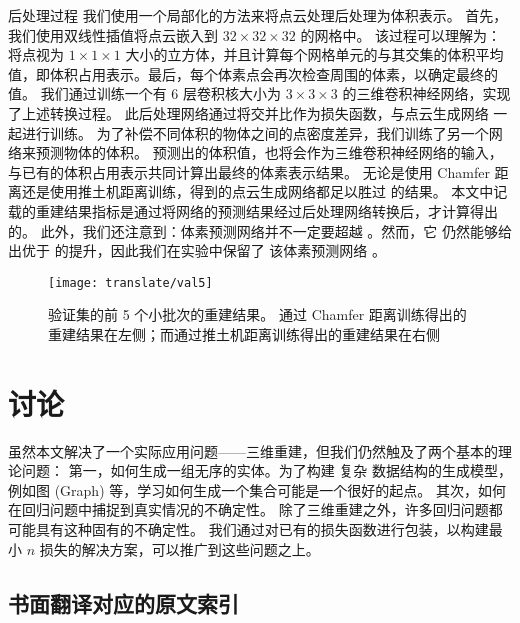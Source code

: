 {\heiti 后处理过程}
我们使用一个局部化的方法来将点云处理后处理为体积表示。
首先，我们使用双线性插值将点云嵌入到 $32 \times 32 \times 32$ 的网格中。
该过程可以理解为：将点视为 $1 \times 1 \times 1$ 大小的立方体，并且计算每个网格单元的与其交集的体积平均值，即体积占用表示。最后，每个体素点会再次检查周围的体素，以确定最终的值。
我们通过训练一个有 6 层卷积核大小为 $3 \times 3 \times 3$  的三维卷积神经网络，实现了上述转换过程。
此后处理网络通过将交并比作为损失函数，与点云生成网络 %
一起进行训练。
为了补偿不同体积的物体之间的点密度差异，我们训练了另一个网络来预测物体的体积。
预测出的体积值，也将会作为三维卷积神经网络的输入，与已有的体积占用表示共同计算出最终的体素表示结果。
无论是使用 Chamfer 距离还是使用推土机距离训练，得到的点云生成网络都足以胜过 \threedrsns 的结果。
本文中记载的重建结果指标是通过将网络的预测结果经过后处理网络转换后，才计算得出的。
此外，我们还注意到：体素预测网络并不一定要超越 \threedrsns。然而，它%
仍然能够给出优于 \threedrsns 的提升，因此我们在实验中保留了
该体素预测网络
。

\begin{figure}[!hp]
	\centering
	\texttt{[image: translate/val5]}
	\caption[]{ 验证集的前 5 个小批次的重建结果。
		通过 Chamfer 距离训练得出的重建结果在左侧；而通过推土机距离训练得出的重建结果在右侧}
	\label{fig:translate:val5}
\end{figure}

\section{讨论}
虽然本文解决了一个实际应用问题——三维重建，但我们仍然触及了两个基本的理论问题：
第一，如何生成一组无序的实体。为了构建%
复杂
数据结构的生成模型，例如图 (Graph) 等，学习如何生成一个集合可能是一个很好的起点。 其次，如何在回归问题中捕捉到真实情况的不确定性。 除了三维重建之外，许多回归问题都可能具有这种固有的不确定性。 我们通过对已有的损失函数进行包装，以构建最小 $n$ 损失的解决方案，可以推广到这些问题之上。


\begin{center}
	\section*{{\songti \xiaosi 书面翻译对应的原文索引}}
\end{center}

